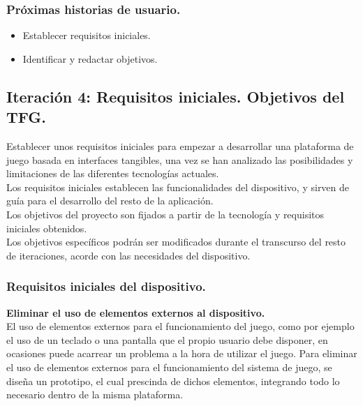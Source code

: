 \subsubsection{Próximas historias de usuario.}
\begin{itemize}
\item Establecer requisitos iniciales.
\item Identificar y redactar objetivos.
\end{itemize}


\subsection{Iteración 4: Requisitos iniciales. Objetivos del TFG.}
\label{subs:itera4}
Establecer unos requisitos iniciales para empezar a desarrollar una plataforma de juego basada en interfaces tangibles, una vez se han analizado las posibilidades y limitaciones de las diferentes tecnologías actuales.\\
Los requisitos iniciales establecen las funcionalidades del dispositivo, y sirven de guía para el desarrollo del resto de la aplicación.\\
Los objetivos del proyecto son fijados a partir de la tecnología y requisitos iniciales obtenidos.\\ 
Los objetivos específicos podrán ser modificados durante el transcurso del resto de iteraciones, acorde con las necesidades del dispositivo.

\subsubsection{Requisitos iniciales del dispositivo.}
\textbf{Eliminar el uso de elementos externos al dispositivo.}\\
El uso de elementos externos para el funcionamiento del juego, como por ejemplo el uso de un teclado o una pantalla que el propio usuario debe disponer, en ocasiones puede acarrear un problema a la hora de utilizar el juego.
Para eliminar el uso de elementos externos para el funcionamiento del sistema de juego, se diseña un prototipo, el cual prescinda de dichos elementos, integrando todo lo necesario dentro de la misma plataforma.\\ 

